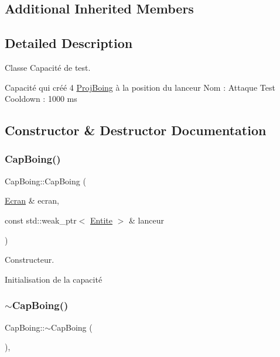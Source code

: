 \subsection*{Additional Inherited Members}


\subsection{Detailed Description}
Classe Capacité de test. 

Capacité qui créé 4 \mbox{\hyperlink{class_proj_boing}{Proj\+Boing}} à la position du lanceur Nom \+: Attaque Test Cooldown \+: 1000 ms 

\subsection{Constructor \& Destructor Documentation}
\mbox{\label{class_cap_boing_a9d315f24e4dfa2406956a9c53624d2ec}} 
\subsubsection{\texorpdfstring{Cap\+Boing()}{CapBoing()}}
{\footnotesize\ttfamily Cap\+Boing\+::\+Cap\+Boing (\begin{DoxyParamCaption}\item[{\mbox{\hyperlink{class_ecran}{Ecran}} \&}]{ecran,  }\item[{const std\+::weak\+\_\+ptr$<$ \mbox{\hyperlink{class_entite}{Entite}} $>$ \&}]{lanceur }\end{DoxyParamCaption})}



Constructeur. 

Initialisation de la capacité \mbox{\label{class_cap_boing_a7f90c88c46fa87ff4c0fb66708648f96}} 
\subsubsection{\texorpdfstring{$\sim$\+Cap\+Boing()}{~CapBoing()}}
{\footnotesize\ttfamily Cap\+Boing\+::$\sim$\+Cap\+Boing (\begin{DoxyParamCaption}{ }\end{DoxyParamCaption})\hspace{0.3cm}{\ttfamily [override]}, {\ttfamily [default]}}



